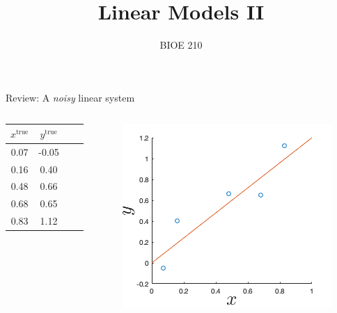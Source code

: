 \documentclass{beamer}
\title{Linear Models II}
\date{}
\author{BIOE 210}
\begin{document}
\maketitle

\begin{frame}{Review: A \emph{noisy} linear system}

\begin{columns}
\begin{column}{0.3\textwidth}
\begin{center}
  \begin{tabular}{cccc}
    \toprule
    $x^\text{true}$ & $y^\text{true}$ \\
    \midrule
    0.07 & -0.05 \\
    0.16 & 0.40 \\
    0.48 & 0.66 \\
    0.68 & 0.65 \\
    0.83 & 1.12 \\
    \bottomrule
  \end{tabular}
\end{center}	
\end{column}

\begin{column}{0.7\textwidth}
\begin{center}
\includegraphics{simple_lin_scatter.png}
\end{center}	
\end{column}
\end{columns}
	
\end{frame}
\end{document}
